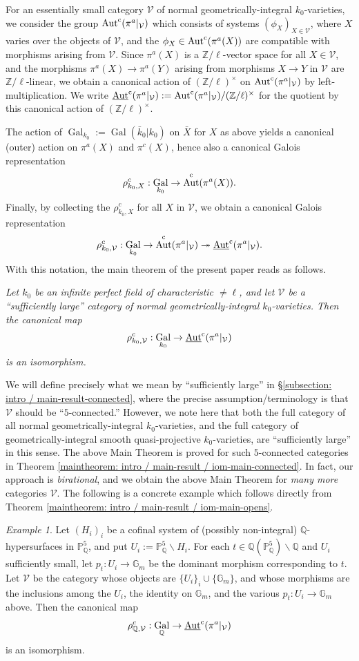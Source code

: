 \documentclass[11pt]{amsart}
\theoremstyle{definition}
\theoremstyle{remark}
\newtheorem{example}[proposition]{Example}
\numberwithin{equation}{section}
\DeclareMathOperator{\Aut}{Aut}
\DeclareMathOperator{\Gal}{Gal}
\newcommand{\Z}{\mathbb{Z}}
\newcommand{\Q}{\mathbb{Q}}
\newcommand{\Gbb}{\mathbb{G}}
\newcommand{\Pbb}{\mathbb{P}}
\newcommand{\Vc}{\mathcal{V}}
\newcommand{\Autc}{\Aut^{\rm c}}
\newcommand{\UAutc}{\underline{\Aut}^{\rm c}}
\newcommand{\Galk}{{\Gal_{k_0}}}
\begin{document}
For an essentially small category $\Vc$ of normal geometrically-integral $k_0$-varieties, we consider the group $\Autc(\pi^a|_\Vc)$ which consists of systems $(\phi_X)_{X \in \Vc}$, where $X$ varies over the objects of $\Vc$, and the $\phi_X \in \Autc(\pi^a(X))$ are compatible with morphisms arising from $\Vc$.
Since $\pi^a(X)$ is a $\Z/\ell$-vector space for all $X \in \Vc$, and the morphisms $\pi^a(X) \rightarrow \pi^a(Y)$ arising from morphisms $X \rightarrow Y$ in $\Vc$ are $\Z/\ell$-linear, we obtain a canonical action of $(\Z/\ell)^\times$ on $\Autc(\pi^a|_\Vc)$ by left-multiplication.
We write $\UAutc(\pi^a|_\Vc) := \Autc(\pi^a|_\Vc)/(\Z/\ell)^\times$ for the quotient by this canonical action of $(\Z/\ell)^\times$.

The action of $\Galk := \Gal(\bar k_0|k_0)$ on $\bar X$ for $X$ as above yields a canonical (outer) action on $\pi^a(X)$ and $\pi^c(X)$, hence also a canonical Galois representation
\[ \rho_{k_0,X}^c : \Galk \rightarrow \Autc(\pi^a(X)). \]
Finally, by collecting the $\rho_{k_0,X}^c$ for all $X$ in $\Vc$, we obtain a canonical Galois representation
\[ \rho_{k_0,\Vc}^c : \Galk \rightarrow \Autc(\pi^a|_\Vc) \twoheadrightarrow \UAutc(\pi^a|_\Vc). \]
With this notation, the main theorem of the present paper reads as follows.

\vskip 5pt
{\em Let $k_0$ be an infinite perfect field of characteristic $\neq \ell$, and let $\Vc$ be a ``sufficiently large'' category of normal geometrically-integral $k_0$-varieties.
Then the canonical map 
\[ \rho_{k_0,\Vc}^c : \Galk \rightarrow \UAutc(\pi^a|_\Vc) \]
is an isomorphism.
}
\vskip 5pt

We will define precisely what we mean by ``sufficiently large'' in \S\ref{subsection: intro / main-result-connected}, where the precise assumption/terminology is that $\Vc$ should be ``$5$-connected.''
However, we note here that both the full category of all normal geometrically-integral $k_0$-varieties, and the full category of geometrically-integral smooth quasi-projective $k_0$-varieties, are ``sufficiently large'' in this sense.
The above Main Theorem is proved for such $5$-connected categories in Theorem \ref{maintheorem: intro / main-result / iom-main-connected}.
In fact, our approach is \emph{birational}, and we obtain the above Main Theorem for \emph{many more} categories $\Vc$.
The following is a concrete example which follows directly from Theorem \ref{maintheorem: intro / main-result / iom-main-opens}.
\begin{example}
  Let $(H_i)_i$ be a cofinal system of (possibly non-integral) $\Q$-hypersurfaces in $\Pbb_\Q^5$, and put $U_i := \Pbb_\Q^5 \smallsetminus H_i$.
  For each $t \in \Q(\Pbb_\Q^5) \smallsetminus \Q$ and $U_i$ sufficiently small, let $p_t : U_i \rightarrow \Gbb_m$ be the dominant morphism corresponding to $t$.
  Let $\Vc$ be the category whose objects are $\{U_i\}_i \cup \{\Gbb_m\}$, and whose morphisms are the inclusions among the $U_i$, the identity on $\Gbb_m$, and the various $p_t : U_i \rightarrow \Gbb_m$ above.
  Then the canonical map 
  \[ \rho_{\Q,\Vc}^c : \Gal_\Q \rightarrow \UAutc(\pi^a|_\Vc) \]
  is an isomorphism.
\end{example}
\end{document}
